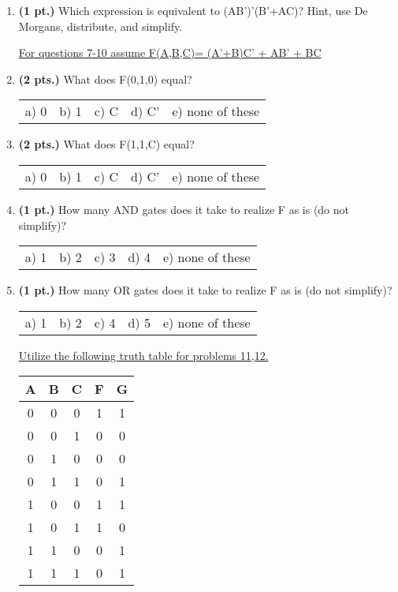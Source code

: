 \documentclass{article}
\begin{document}
\begin{enumerate}
\item {\bf (1 pt.)} Which expression is equivalent to (AB')'(B'+AC)?
Hint, use De Morgans, distribute, and simplify.

\pagebreak

\underline{For questions 7-10 assume F(A,B,C)= (A'+B)C' + AB' + BC}

\item {\bf (2 pts.)} What does F(0,1,0) equal?

\begin{tabular}{p{0.7in} p{0.7in} p{0.7in} p{0.7in} l}
a) 0 & b) 1 & c) C & d) C' & e) none of these
\end{tabular}

\item {\bf (2 pts.)} What does F(1,1,C) equal?

\begin{tabular}{p{0.7in} p{0.7in} p{0.7in} p{0.7in} l}
a) 0 & b) 1 & c) C & d) C' & e) none of these
\end{tabular}

\item {\bf (1 pt.)} How many AND gates does it take to realize F
as is (do not simplify)?

\begin{tabular}{p{0.7in} p{0.7in} p{0.7in} p{0.7in} l}
a) 1 & b) 2 & c) 3 & d) 4 & e) none of these
\end{tabular}

\item {\bf (1 pt.)} How many OR gates does it take to realize F
as is (do not simplify)?

\begin{tabular}{p{0.7in} p{0.7in} p{0.7in} p{0.7in} l}
a) 1 & b) 2 & c) 4 & d) 5 & e) none of these
\end{tabular}

\underline{Utilize the following truth table for problems 11,12.}

\begin{tabular}{c|c|c||c|c}
A & B & C & F & G \\ \hline \hline
0 & 0 & 0 & 1 & 1 \\ \hline
0 & 0 & 1 & 0 & 0 \\ \hline
0 & 1 & 0 & 0 & 0 \\ \hline
0 & 1 & 1 & 0 & 1 \\ \hline
1 & 0 & 0 & 1 & 1 \\ \hline
1 & 0 & 1 & 1 & 0 \\ \hline
1 & 1 & 0 & 0 & 1 \\ \hline
1 & 1 & 1 & 0 & 1 \\
\end{tabular} 


\end{enumerate}
\end{document}
